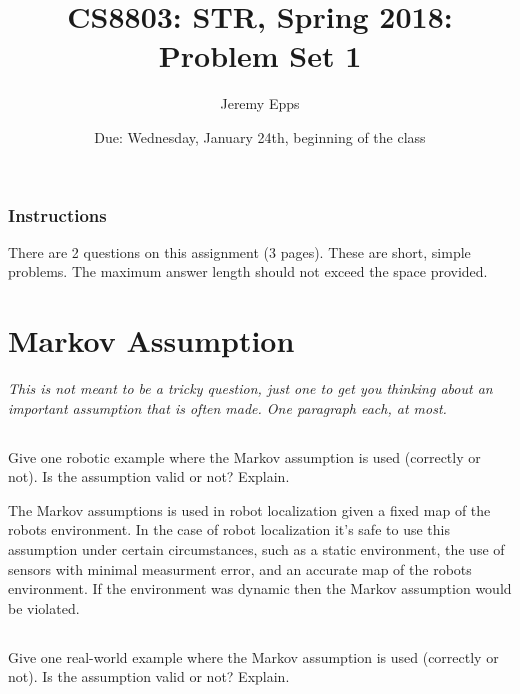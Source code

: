 \documentclass{article}
\title{CS8803: STR, Spring 2018: Problem Set 1}
\author{Jeremy Epps}
\date{Due: Wednesday, January 24th, beginning of the class}
\begin{document}
\maketitle


\subsubsection*{Instructions}  There are 2 questions on this assignment (3 pages).  These are short, simple problems. The maximum answer length should not exceed the space provided.


\section{Markov Assumption}
\emph{This is not meant to be a tricky question, just one to get you thinking about an important assumption that is often made. One paragraph each, at most.}


\subsection{}
Give one robotic example where the Markov assumption is used (correctly or not).  Is the assumption valid or not?  Explain.

\vspace{5mm}

The Markov assumptions is used in robot localization given a fixed map of the robots environment. In the case of robot localization it's safe to use this assumption under certain circumstances, such as a static environment, the use of sensors with minimal measurment error, and an accurate map of the robots environment.  If the environment was dynamic then the Markov assumption would be violated.


\subsection{}
Give one real-world example where the Markov assumption is used (correctly or not).  Is the assumption valid or not?  Explain.

\vspace{5mm}
\end{document}
